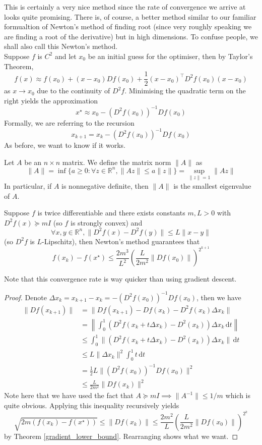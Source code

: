 This is certainly a very nice method since the rate of convergence we arrive at looks quite promising.
There is, of course, a better method similar to our familiar formualtion of Newton's method of finding root (since very roughly speaking we are finding a root of the derivative) but in high dimensions.
To confuse people, we shall also call this Newton's method.\\
Suppose $f$ is $C^2$ and let $x_0$ be an initial guess for the optimiser, then by Taylor's Theorem,
$$f(x)\approx f(x_0)+(x-x_0)Df(x_0)+\frac{1}{2}(x-x_0)^\top D^2f(x_0)(x-x_0)$$
as $x\to x_0$ due to the continuity of $D^2f$.
Minimising the quadratic term on the right yields the approximation
$$x^\star\approx x_0-(D^2f(x_0))^{-1}Df(x_0)$$
Formally, we are referring to the recursion
$$x_{k+1}=x_k-(D^2f(x_0))^{-1}Df(x_0)$$
As before, we want to know if it works.
\begin{definition}
    Let $A$ be an $n\times n$ matrix.
    We define the matrix norm $\|A\|$ as
    $$\|A\|=\inf\{a\ge 0:\forall z\in\mathbb R^n,\|Az\|\le a\|z\|\}=\sup_{\|z\|=1}\|Az\|$$
    In particular, if $A$ is nonnegative definite, then $\|A\|$ is the smallest eigenvalue of $A$.
\end{definition}
\begin{theorem}
    Suppose $f$ is twice differentiable and there exists constants $m,L>0$ with $D^2f(x)\succeq mI$ (so $f$ is strongly convex) and
    $$\forall x,y\in\mathbb R^n,\|D^2f(x)-D^2f(y)\|\le L\|x-y\|$$
    (so $D^2f$ is $L$-Lipschitz), then Newton's method guarantees that
    $$f(x_k)-f(x^\star)\le \frac{2m^3}{L^2}\left(\frac{L}{2m^2}\|Df(x_0)\|\right)^{2^{k+1}}$$
\end{theorem}
Note that this convergence rate is way quicker than using gradient descent.
\begin{proof}
    Denote $\Delta x_k=x_{k+1}-x_k=-(D^2f(x_0))^{-1}Df(x_0)$, then we have
    \begin{align*}
        \|Df(x_{k+1})\|&=\|Df(x_{k+1})-Df(x_k)-D^2f(x_k)\Delta x_k\|\\
        &=\left\|\int_0^1(D^2f(x_k+t\Delta x_k)-D^2(x_k))\Delta x_k\,\mathrm dt\right\|\\
        &\le\int_0^1\|(D^2f(x_k+t\Delta x_k)-D^2(x_k))\Delta x_k\|\,\mathrm dt\\
        &\le L\|\Delta x_k\|^2\int_0^1t\,\mathrm dt\\
        &=\frac{1}{2}L\|(D^2f(x_0))^{-1}Df(x_0)\|^2\\
        &\le\frac{L}{2m^2}\|Df(x_k)\|^2
    \end{align*}
    Note here that we have used the fact that $A\succeq mI\implies \|A^{-1}\|\le 1/m$ which is quite obvious.
    Applying this inequality recursively yields
    $$\sqrt{2m(f(x_k)-f(x^\star))}\le\|Df(x_k)\|\le\frac{2m^2}{L}\left( \frac{L}{2m^2}\|Df(x_0)\| \right)^{2^k}$$
    by Theorem \ref{gradient_lower_bound}.
    Rearranging shows what we want.
\end{proof}